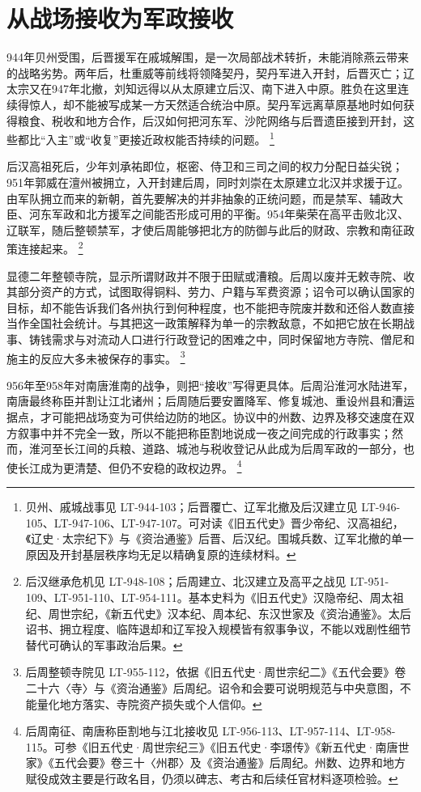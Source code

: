 \section{从战场接收为军政接收}

944年贝州受围，后晋援军在戚城解围，是一次局部战术转折，未能消除燕云带来的战略劣势。两年后，杜重威等前线将领降契丹，契丹军进入开封，后晋灭亡；辽太宗又在947年北撤，刘知远得以从太原建立后汉、南下进入中原。胜负在这里连续得惊人，却不能被写成某一方天然适合统治中原。契丹军远离草原基地时如何获得粮食、税收和地方合作，后汉如何把河东军、沙陀网络与后晋遗臣接到开封，这些都比“入主”或“收复”更接近政权能否持续的问题。%
\footnote{贝州、戚城战事见 LT-944-103；后晋覆亡、辽军北撤及后汉建立见 LT-946-105、LT-947-106、LT-947-107。可对读《旧五代史》晋少帝纪、汉高祖纪，《辽史·太宗纪下》与《资治通鉴》后晋、后汉纪。围城兵数、辽军北撤的单一原因及开封基层秩序均无足以精确复原的连续材料。}

后汉高祖死后，少年刘承祐即位，枢密、侍卫和三司之间的权力分配日益尖锐；951年郭威在澶州被拥立，入开封建后周，同时刘崇在太原建立北汉并求援于辽。由军队拥立而来的新朝，首先要解决的并非抽象的正统问题，而是禁军、辅政大臣、河东军政和北方援军之间能否形成可用的平衡。954年柴荣在高平击败北汉、辽联军，随后整顿禁军，才使后周能够把北方的防御与此后的财政、宗教和南征政策连接起来。%
\footnote{后汉继承危机见 LT-948-108；后周建立、北汉建立及高平之战见 LT-951-109、LT-951-110、LT-954-111。基本史料为《旧五代史》汉隐帝纪、周太祖纪、周世宗纪，《新五代史》汉本纪、周本纪、东汉世家及《资治通鉴》。太后诏书、拥立程度、临阵退却和辽军投入规模皆有叙事争议，不能以戏剧性细节替代可确认的军事政治后果。}

显德二年整顿寺院，显示所谓财政并不限于田赋或漕粮。后周以废并无敕寺院、收其部分资产的方式，试图取得铜料、劳力、户籍与军费资源；诏令可以确认国家的目标，却不能告诉我们各州执行到何种程度，也不能把寺院废并数和还俗人数直接当作全国社会统计。与其把这一政策解释为单一的宗教敌意，不如把它放在长期战事、铸钱需求与对流动人口进行行政登记的困难之中，同时保留地方寺院、僧尼和施主的反应大多未被保存的事实。%
\footnote{后周整顿寺院见 LT-955-112，依据《旧五代史·周世宗纪二》《五代会要》卷二十六〈寺〉与《资治通鉴》后周纪。诏令和会要可说明规范与中央意图，不能量化地方落实、寺院资产损失或个人信仰。}

956年至958年对南唐淮南的战争，则把“接收”写得更具体。后周沿淮河水陆进军，南唐最终称臣并割让江北诸州；后周随后要安置降军、修复城池、重设州县和漕运据点，才可能把战场变为可供给边防的地区。协议中的州数、边界及移交速度在双方叙事中并不完全一致，所以不能把称臣割地说成一夜之间完成的行政事实；然而，淮河至长江间的兵粮、道路、城池与税收登记从此成为后周军政的一部分，也使长江成为更清楚、但仍不安稳的政权边界。%
\footnote{后周南征、南唐称臣割地与江北接收见 LT-956-113、LT-957-114、LT-958-115。可参《旧五代史·周世宗纪三》《旧五代史·李璟传》《新五代史·南唐世家》《五代会要》卷三十〈州郡〉及《资治通鉴》后周纪。州数、边界和地方赋役成效主要是行政名目，仍须以碑志、考古和后续任官材料逐项检验。}

